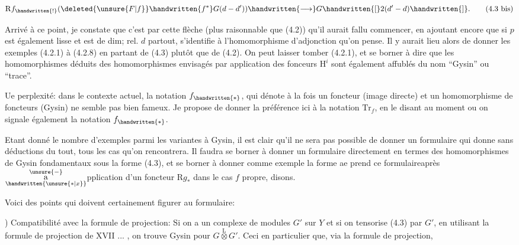 
\[
\mathrm{R}f_{\handwritten{!}}(\deleted{\unsure{F|f}}\handwritten{f^*}G(d-d'))\handwritten{\longrightarrow}G\handwritten{[}2(d'-d)\handwritten{]}.
\tag*{(4.3 bis)}
\]

Arrivé à ce point, je constate que c'est par cette flèche (plus raisonnable que (4.2)) qu'il aurait fallu commencer, en ajoutant encore que si $p$ est également lisse et est de dim; rel. $d$ partout,  s'identifie à l'homomorphisme d'adjonction qu'on pense. Il y aurait lieu alors de donner les exemples (4.2.1) à (4.2.8)  en partant de (4.3) plutôt que de (4.2). On peut laisser tomber (4.2.1), et se borner à dire que les homomorphismes déduits des homomorphismes envisagés par application des fonceurs $\mathrm{H}^i$ sont également affublés du nom \unsure{\deleted{(}|(}``Gysin'' ou ``trace''.

Ue perplexité: dans le contexte actuel, la notation $f_{\handwritten{*}}$, qui dénote à la fois un foncteur (image directe) et un homomorphisme de foncteurs (Gysin) ne semble pas bien fameux. Je propose de donner la préférence ici à la notation $\mathrm{Tr}_f$, en le disant au moment ou on signale également la notation $f_{\handwritten{*}}$.

Etant donné le nombre d'exemples parmi les variantes à Gysin, il est clair qu'il ne sera pas possible de donner un formulaire qui donne  sans déductions du tout, tous les cas qu'on rencontrera. Il faudra se borner à donner un formulaire directement en termes des homomorphismes de Gysin fondamentaux sous la forme (4.3), et se borner à donner comme exemple la forme ae prend ce formulaireaprès $\overset{\unsure{-}}{\underset{\handwritten{\unsure{*|x}}}{\mathrm{a}}}$pplication d'un foncteur $\mathrm{R}g_*$ dans le cas $f$ propre, disons.

Voici des points qui doivent certainement figurer au formulaire:

) Compatibilité avec la formule de projection: Si on a un complexe de modules $G'$ sur $Y$ et si on tensorise (4.3) par $G'$, en utilisant la formule de projection de XVII ... , on trouve Gysin pour $G\overset{\mathrm{L}}{\otimes}G'$. Ceci  en particulier que, via la formule de projection,

